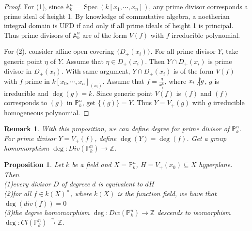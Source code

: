 \documentclass{ctexart}
\newtheorem{remark}{Remark}[section]
\newtheorem{proposition}{Proposition}[section]
\newcommand{\spec}{\operatorname{Spec}}
\begin{document}
\begin{proof}
    For (1), since $\mathbb{A}_{k}^{n} = \spec(k[x_{1}, \cdots, x_{n}])$, any prime divisor corresponds a prime ideal of height 1.
    By knowledge of commutative algebra, a noetherian integral domain is UFD if and only if all prime ideals of height 1 is principal.
    Thus prime divisors of $\mathbb{A}_{k}^{n}$ are of the form $V(f)$ with $f$ irreducible polynomial.
    \par
    For (2), consider affine open covering $\{D_{+}(x_{i})\}$.
    For all prime divisor $Y$, take generic point $\eta$ of $Y$.
    Assume that $\eta\in D_{+}(x_{i})$.
    Then $Y \cap D_{+}(x_{i})$ is prime divisor in $D_{+}(x_{i})$.
    With same argument, $Y \cap D_{+}(x_{i})$ is of the form $V(f)$ with $f$ prime in $k[x_{0}, \cdots, x_{n}]_{(x_{i})}$.
    Assume that $f = \frac{g}{x_{i}^{k}}$, where $x_{i} \not\big{|} g$, $g$ is irreducible and $\deg(g) = k$.
    Since generic point $V(f)$ is $(f)$ and $(f)$ corresponds to $(g)$ in $\mathbb{P}_{k}^{n}$, get $\overline{\{(g)\}} = Y$.
    Thus $Y = V_{+}(g)$ with $g$ irreducible homogeneous polynomial.
\end{proof}
\begin{remark}
    With this proposition, we can define degree for prime divisor of $\mathbb{P}_{k}^{n}$.
    For prime divisor $Y = V_{+}(f)$, define $\deg(Y) = \deg(f)$.
    Get a group homomorphism $\deg: Div(\mathbb{P}_{k}^{n}) \longrightarrow \mathbb{Z}$.
\end{remark}
\begin{proposition}
    Let $k$ be a field and $X = \mathbb{P}_{k}^{n}$, $H = V_{+}(x_{0}) \subseteq X$ hyperplane.
    Then \\
    (1)every divisor $D$ of degreee $d$ is equivalent to $dH$ \\
    (2)for all $f\in k(X)^{\times}$, where $k(X)$ is the function field, we have that $\deg(div(f)) = 0$ \\
    (3)the degree homomorphism $\deg: Div(\mathbb{P}_{k}^{n}) \longrightarrow \mathbb{Z}$ descends to isomorphism $\deg: Cl(\mathbb{P}_{k}^{n}) \overset{\sim}{\longrightarrow} \mathbb{Z}$.
    \label{Proposition 8.3}
\end{proposition}
\end{document}
